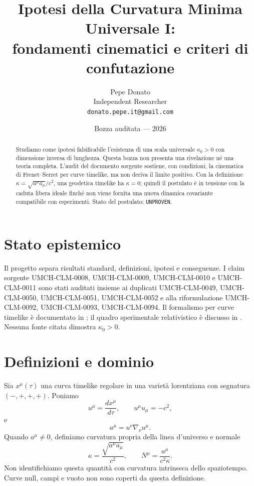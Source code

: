 \documentclass[11pt,a4paper]{article}
\title{Ipotesi della Curvatura Minima Universale I:\\fondamenti cinematici e criteri di confutazione}
\author{Pepe Donato\\Independent Researcher\\\texttt{donato.pepe.it@gmail.com}}
\date{Bozza auditata --- 2026}
\begin{document}
\maketitle

\begin{abstract}
Studiamo come ipotesi falsificabile l'esistenza di una scala universale $\kappa_0>0$ con dimensione inversa di lunghezza. Questa bozza non presenta una rivelazione né una teoria completa. L'audit del documento sorgente sostiene, con condizioni, la cinematica di Frenet--Serret per curve timelike, ma non deriva il limite positivo. Con la definizione $\kappa=\sqrt{a^\mu a_\mu}/c^2$, una geodetica timelike ha $\kappa=0$; quindi il postulato è in tensione con la caduta libera ideale finché non viene fornita una nuova dinamica covariante compatibile con esperimenti. Stato del postulato: \texttt{UNPROVEN}.
\end{abstract}

\section{Stato epistemico}\label{sec:status}
Il progetto separa risultati standard, definizioni, ipotesi e conseguenze. I claim sorgente UMCH-CLM-0008, UMCH-CLM-0009, UMCH-CLM-0010 e UMCH-CLM-0011 sono stati auditati insieme ai duplicati UMCH-CLM-0049, UMCH-CLM-0050, UMCH-CLM-0051, UMCH-CLM-0052 e alla riformulazione UMCH-CLM-0092, UMCH-CLM-0093, UMCH-CLM-0094. Il formalismo per curve timelike è documentato in \cite{FormigaRomero2006}; il quadro sperimentale relativistico è discusso in \cite{Will2014}. Nessuna fonte citata dimostra $\kappa_0>0$.

\section{Definizioni e dominio}\label{sec:definitions}
Sia $x^\mu(\tau)$ una curva timelike regolare in una varietà lorentziana con segnatura $(-,+,+,+)$. Poniamo
\begin{equation}\label{eq:velocity}
u^\mu=\frac{dx^\mu}{d\tau},\qquad u^\mu u_\mu=-c^2,
\end{equation}
e
\begin{equation}\label{eq:acceleration}
a^\mu=u^\nu\nabla_\nu u^\mu.
\end{equation}
Quando $a^\mu\ne0$, definiamo curvatura propria della linea d'universo e normale
\begin{equation}\label{eq:curvature}
\kappa=\frac{\sqrt{a^\mu a_\mu}}{c^2},\qquad N^\mu=\frac{a^\mu}{c^2\kappa}.
\end{equation}
Non identifichiamo questa quantità con curvatura intrinseca dello spaziotempo. Curve null, campi e vuoto non sono coperti da questa definizione.
\end{document}
